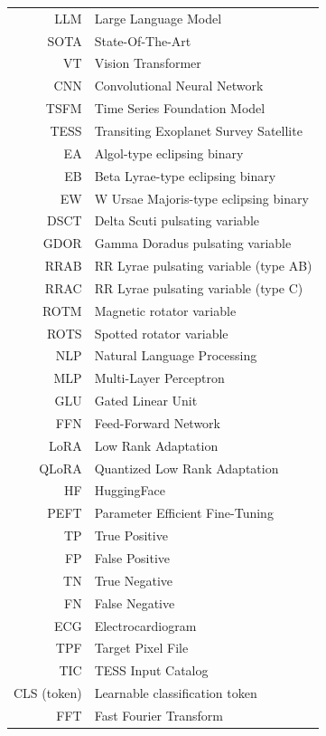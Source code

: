 \documentclass[english,bachelor,twoside]{ctufit-thesis}
\begin{document}
    \begin{tabular}{rl}
        LLM  & Large Language Model         \\
        SOTA & State-Of-The-Art             \\
        VT & Vision Transformer \\
        CNN  & Convolutional Neural Network \\
        TSFM & Time Series Foundation Model \\
        TESS & Transiting Exoplanet Survey Satellite \\
        EA & Algol-type eclipsing binary \\
        EB & Beta Lyrae-type eclipsing binary \\
        EW & W Ursae Majoris-type eclipsing binary \\
        DSCT & Delta Scuti pulsating variable \\
        GDOR & Gamma Doradus pulsating variable \\
        RRAB & RR Lyrae pulsating variable (type AB) \\
        RRAC & RR Lyrae pulsating variable (type C) \\
        ROTM & Magnetic rotator variable \\
        ROTS & Spotted rotator variable \\
        NLP & Natural Language Processing \\
        MLP & Multi-Layer Perceptron \\
        GLU & Gated Linear Unit \\
        FFN & Feed-Forward Network \\
        LoRA & Low Rank Adaptation \\
        QLoRA & Quantized Low Rank Adaptation \\
        HF   & HuggingFace                  \\
        PEFT & Parameter Efficient Fine-Tuning \\
        TP   & True Positive                \\
        FP   & False Positive               \\
        TN   & True Negative                \\
        FN   & False Negative               \\
        ECG  & Electrocardiogram            \\
        TPF & Target Pixel File \\
        TIC & TESS Input Catalog \\
        CLS (token) & Learnable classification token \\
        FFT & Fast Fourier Transform \\




    \end{tabular}
    \resumeTOCentries
    \mainmatter\mainmatterinit %
\end{document}
